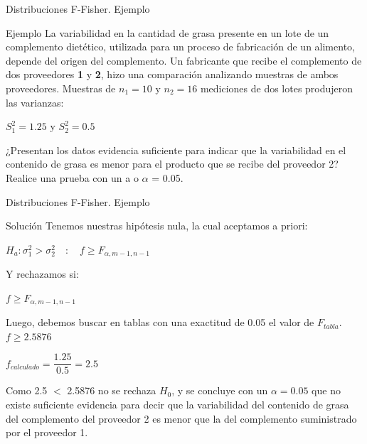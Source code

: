 \documentclass[11pt]{beamer}
\begin{document}
      \begin{frame}{Distribuciones F-Fisher. Ejemplo}
          \begin{block}{Ejemplo}
            La variabilidad en la cantidad de grasa presente en un lote de un complemento dietético, utilizada para un proceso de fabricación de un alimento, depende del origen del complemento. Un fabricante que recibe el complemento de dos proveedores \textbf{1} y \textbf{2}, hizo una comparación analizando muestras de ambos proveedores. Muestras de $n_1=10$ y $n_2=16$ mediciones de dos lotes produjeron las varianzas:

            $S^2_1=1.25$ y $S^2_2=0.5$

            ¿Presentan los datos evidencia suficiente para indicar que la variabilidad en el contenido de grasa es menor para el producto que se recibe del proveedor 2? Realice una prueba con un a o $\alpha$ = 0.05.
          \end{block}
      \end{frame}
      \begin{frame}{Distribuciones F-Fisher. Ejemplo}
          \begin{block}{Soluci\'on}
              Tenemos nuestras hipótesis nula, la cual aceptamos a priori:

              $H_a: \sigma^2_1 > \sigma^2_2\quad : \quad f \geq F_{\alpha,m-1,n-1}$

              Y rechazamos si:

              $f \geq F_{\alpha,m-1,n-1}$

              Luego, debemos buscar en tablas con una exactitud de 0.05 el valor de $F_{tabla}$.
              \pause
              $f \geq 2.5876$

              $f_{calculado} = \dfrac{1.25}{0.5}=2.5$
              \pause
              \vspace{0.2px}

              Como 2.5 $<$ 2.5876 no se rechaza $H_0$, y se concluye con un $\alpha= 0.05$ que no existe suficiente evidencia para decir que la variabilidad del contenido de grasa del complemento del proveedor 2 es menor que la del complemento suministrado por el proveedor 1.
          \end{block}
      \end{frame}
\end{document}

